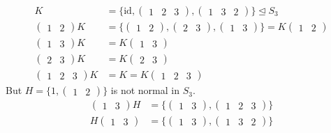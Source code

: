 \begin{example}
\begin{align*}
    K &= \{ \text{id}, \begin{pmatrix}1 & 2 & 3\end{pmatrix}, \begin{pmatrix}1 & 3 & 2\end{pmatrix} \} \trianglelefteq S_3 \\
    \begin{pmatrix}1 & 2\end{pmatrix} K &= \{ \begin{pmatrix}1 & 2\end{pmatrix}, \begin{pmatrix}2 & 3\end{pmatrix}, \begin{pmatrix}1 & 3\end{pmatrix} \} = K \begin{pmatrix}1 & 2\end{pmatrix} \\
    \begin{pmatrix}1 & 3\end{pmatrix} K &= K \begin{pmatrix}1 & 3\end{pmatrix} \\
    \begin{pmatrix}2 & 3\end{pmatrix} K &= K \begin{pmatrix}2 & 3\end{pmatrix} \\
    \begin{pmatrix}1 & 2 & 3\end{pmatrix} K &= K = K \begin{pmatrix}1 & 2 & 3\end{pmatrix}
\end{align*}
But \(H = \{ 1, \begin{pmatrix}1 & 2\end{pmatrix} \}\) is not normal in \(S_3\).
\begin{align*}
    \begin{pmatrix}1 & 3\end{pmatrix} H &= \{ \begin{pmatrix}1 & 3\end{pmatrix}, \begin{pmatrix}1 & 2 & 3\end{pmatrix} \} \\
    H \begin{pmatrix}1 & 3\end{pmatrix} &= \{ \begin{pmatrix}1 & 3\end{pmatrix}, \begin{pmatrix}1 & 3 & 2\end{pmatrix} \}
\end{align*}
\end{example}

